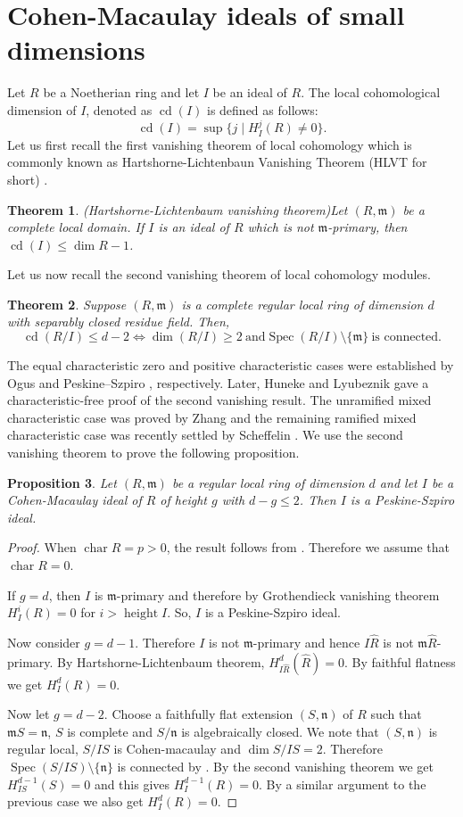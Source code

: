 \documentclass[12pt,reqno]{amsart}
\newtheorem{theorem}{Theorem}[section]
\newtheorem{proposition}[theorem]{Proposition}
\theoremstyle{definition}
\newcommand{\m}{\mathfrak{m}}
\newcommand{\n}{\mathfrak{n}}
\newcommand{\height}{\operatorname{height}}
\newcommand{\cd}{\operatorname{cd}}
\newcommand{\Spec}{\operatorname{Spec}}
\newcommand{\Char}{\operatorname{char}}
\begin{document}
\section{Cohen-Macaulay ideals of small dimensions}
Let $R$ be a Noetherian ring and let $I$ be an ideal of $R$. The local cohomological dimension of $I$, denoted as $\cd(I)$ is defined as follows:
$$\cd(I)=\sup\{j\mid H^j_I(R)\neq 0\}.$$
Let us first recall the first vanishing theorem of local cohomology which is commonly known as Hartshorne-Lichtenbaun Vanishing Theorem (HLVT for short) \cite{Har68}.
\begin{theorem}(Hartshorne-Lichtenbaum vanishing theorem)\label{HLVT}
    Let $(R,\m)$ be a complete local domain. If $I$ is an ideal of $R$ which is not $\m$-primary, then $\operatorname{cd}(I)\leq \dim R-1$.
\end{theorem}
Let us now recall the second vanishing theorem of local cohomology modules.
\begin{theorem}
    Suppose $(R,\m)$ is a complete regular local ring of dimension $d$ with separably closed residue field. Then, $$\cd(R/I)\leq d-2 \iff \dim(R/I)\geq 2 \ \text{and} \Spec(R/I)\setminus\{\m\}\ \text{is connected}.$$
\end{theorem}
The equal characteristic zero and positive characteristic cases were established by Ogus \cite{Ogu73} and Peskine–Szpiro \cite{PS73}, respectively. Later, Huneke and Lyubeznik \cite{HL90} gave a characteristic-free proof of the second vanishing result. The unramified mixed characteristic case was proved by Zhang \cite{Zha25} and the remaining ramified mixed characteristic case was recently settled by Scheffelin \cite{Sch26}. We use the second vanishing theorem to prove the following proposition.
\begin{proposition}\label{PS ideals of small dimension}
    Let $(R,\m)$ be a regular local ring of dimension $d$ and let $I$ be a Cohen-Macaulay ideal of $R$ of height $g$ with $d-g\leq 2$. Then $I$ is a Peskine-Szpiro ideal.
\end{proposition}
\begin{proof}
    When $\Char R=p>0$, the result follows from \cite[Proposition III.4.1]{PS73}. Therefore we assume that $\Char R=0$.

    If $g=d$, then $I$ is $\m$-primary and therefore by Grothendieck vanishing theorem $H^i_I(R)=0$ for $i> \height I$. So, $I$ is a Peskine-Szpiro ideal.

    Now consider $g=d-1$. Therefore $I$ is not  $\m$-primary and hence $I\hat{R}$ is not $\m\hat{R}$-primary. By Hartshorne-Lichtenbaum theorem, $H^d_{I\hat{R}}(\hat{R})=0$. By faithful flatness we get $H^d_I(R)=0$.

    Now let $g=d-2$. Choose a faithfully flat extension $(S,\n)$ of $R$ such that $\m S=\n$, $S$ is complete and $S/\n$ is algebraically closed. We note that $(S,\n)$ is regular local, $S/I S$ is Cohen-macaulay and $\dim S/I S=2$. Therefore $\Spec(S/IS)\setminus\{\n\}$ is connected by \cite[Theorem 15.7]{ILL+07}. By the second vanishing theorem we get  $H^{d-1}_{IS}(S)=0$ and this gives $H^{d-1}_I(R)=0$. By a similar argument to the previous case we also get $H^d_I(R)=0$.
    \end{proof}
\end{document}
